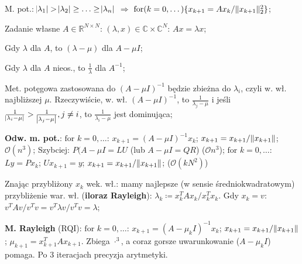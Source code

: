 
\entry
M. pot.:
$\abs{\lambda_1}>\abs{\lambda_2}\geq\ldots\geq\abs{\lambda_n}$
$\Rightarrow$
$\mathrm{for}(k=0,\dots)\{x_{k+1}=Ax_k / \|x_{k+1}\|^2_2\}$;

\entry
Zadanie własne $A \in \mathbb{R}^{N \times N}$:
$(\lambda,x) \in \mathbb{C} \times \mathbb{C}^N$:
$Ax = \lambda x$;

\entry
Gdy $\lambda$ dla $A$, to $(\lambda - \mu)$ dla $A-\mu I$;

\entry
Gdy $\lambda$ dla $A$ nieos., to $\frac{1}{\lambda}$ dla $A^{-1}$;

\entry
Met. potęgowa zastosowana do
$(A-\mu I)^{-1}$
będzie zbieżna do
$\lambda_i$,
czyli w. wł. najbliższej $\mu$.
Rzeczywiście, w. wł.
$(A-\mu I)^{-1}$,
to
$\frac{1}{\lambda_j-\mu}$
i jeśli
$\frac{1}{\abs{\lambda_i-\mu}} > \frac{1}{\abs{\lambda_j-\mu}}, j\neq i$,
to
$\frac{1}{\lambda_i-\mu}$
jest dominująca;


\entry
\textbf{Odw. m. pot.}:
$\text{for } k=0,\ldots$:
$x_{k+1} = (A-\mu I)^{-1}x_k$;
$x_{k+1} = x_{k+1} / \|x_{k+1}\|$;
$\mathcal{O}(n^3)$;
\entry
Szybciej:
$P(A- \mu I = LU$ (lub $A-\mu I = QR$) ($\mathcal{O}{n^3}$);
$\text{for } k=0,\ldots$:
$Ly=Px_k$;
$Ux_{k+1} = y$;
$x_{k+1} = x_{k+1} / \|x_{k+1}\|$;
($\mathcal{O}(kN^2)$)

\entry
Znając przybliżony $x_k$ wek. wł.: mamy najlepsze (w sensie
średniokwadratowym) przybliżenie war. wł. (\textbf{iloraz Rayleigh}):
$\lambda_k \coloneqq x_k^T A x_k / x_k^T x_k$.
Gdy $x_k = v$:
$v^T A v / v^T v = v^T \lambda v / v^T v = \lambda$;

\entry
\textbf{M. Rayleigh} (RQI):
$\text{for } k=0,\ldots$:
$x_{k+1} = (A - \mu_k I)^{-1} x_k$;
$x_{k+1} = x_{k+1} / \|x_{k+1}\|$;
$\mu_{k+1} = x_{k+1}^T A x_{k+1}$.
Zbiega $\cdot^3$, a coraz gorsze uwarunkowanie ($A-\mu_k I$) pomaga.
Po $3$ iteracjach precyzja arytmetyki.





